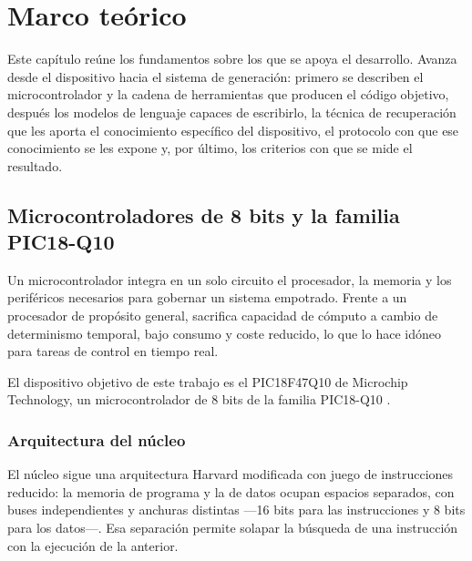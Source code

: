 
\chapter{Marco teórico}

Este capítulo reúne los fundamentos sobre los que se apoya el desarrollo. Avanza
desde el dispositivo hacia el sistema de generación: primero se describen el
microcontrolador y la cadena de herramientas que producen el código objetivo,
después los modelos de lenguaje capaces de escribirlo, la técnica de
recuperación que les aporta el conocimiento específico del dispositivo, el
protocolo con que ese conocimiento se les expone y, por último, los criterios
con que se mide el resultado.

\section{Microcontroladores de 8 bits y la familia PIC18-Q10}

Un microcontrolador integra en un solo circuito el procesador, la memoria y los
periféricos necesarios para gobernar un sistema empotrado. Frente a un
procesador de propósito general, sacrifica capacidad de cómputo a cambio de
determinismo temporal, bajo consumo y coste reducido, lo que lo hace idóneo para
tareas de control en tiempo real.

El dispositivo objetivo de este trabajo es el PIC18F47Q10 de Microchip
Technology, un microcontrolador de 8 bits de la familia PIC18-Q10
\cite{microchip2024ds40002043}.

\subsection{Arquitectura del núcleo}

El núcleo sigue una arquitectura Harvard modificada con juego de instrucciones
reducido: la memoria de programa y la de datos ocupan espacios separados, con
buses independientes y anchuras distintas —16 bits para las instrucciones y
8 bits para los datos—. Esa separación permite solapar la búsqueda de una
instrucción con la ejecución de la anterior.

